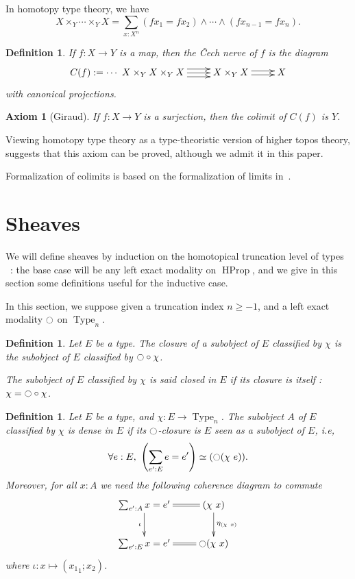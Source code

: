 \documentclass[conference]{IEEEtran}
\makeatletter
\newtheorem{defi}[thm]{Definition}
\newtheorem{ax}[thm]{Axiom}
\newcommand{\ie}{i.e,\xspace}
\def\dar[#1]#2{\ar@<-#2>[#1]\ar@<#2>[#1]} %
\def\tar[#1]#2{\ar@<#2>[#1]\ar@<0pt>[#1]\ar@<-#2>[#1]} %
\DeclareMathOperator{\Type}{Type}
\DeclareMathOperator{\HProp}{HProp}
\newcommand{\modal}{\ensuremath{\ocircle}}
\makeatother
\begin{document}
In homotopy type theory, we have 
$$X\times_Y \cdots\times_Y X = \sum_{x:X^n} (f x_1 = f x_2) \land
\cdots \land (f x_{n-1} = f x_n).$$
\begin{defi}
  If $f:X \to Y$ is a map, then the {\em \v{C}ech nerve} of $f$ is the
  diagram
  $$\xymatrix{
    C(f) := \cdots~ X \times_Y X \times_Y X \tar[r]{4pt} & X \times_Y X \dar[r]{2pt} & X
  }$$
with canonical projections.
\end{defi}

\begin{ax}[Giraud]
  If $f:X\to Y$ is a surjection, then the
colimit of $C(f)$ is $Y$.
\end{ax}

Viewing homotopy type theory as a
type-theoristic version of higher topos theory, \cite{lurie} suggests that this
axiom can be proved, although we admit it in this paper.

Formalization of colimits is based on the formalization of limits in~\cite{lumsdaine}.

\section{Sheaves}
\label{sec:sheaves}

We will define sheaves by induction on the homotopical truncation level of types
~: the base case will be any left exact modality on $\HProp$, and we
give in this section some definitions useful for the inductive case.


In this section, we suppose given a truncation index $n\geqslant -1$,
and a left exact modality $\modal$ on $\Type_n$.

\begin{defi}
  Let $E$ be a type. The {\em closure} of a subobject of $E$ classified by $\chi$
  is the subobject of $E$ classified by $\modal \circ \chi$.

  The subobject of $E$ classified by $\chi$ is said {\em closed in
    $E$} if its closure is itself : $\chi = \modal \circ \chi$.
\end{defi}

\begin{defi}
  Let $E$ be a type, and $\chi:E \to \Type_n$. The subobject $A$ of $E$
  classified by $\chi$ is {\em dense} in $E$ if its $\modal$-closure
  is $E$ seen as a subobject of $E$, \ie
  $$\forall e:E,~ \left(\sum_{e':E} e=e'\right) \simeq (\modal (\chi~e)).$$ 
  Moreover, for all $x:A$ we need the following coherence diagram to
  commute
  $$\xymatrix{
    \sum_{e':A} x = e' \ar@{=}[r] \ar[d]_\iota & (\chi~x) \ar[d]^{\eta_{(\chi~x)}}\\
    \sum_{e':E} x = e' \ar@{=}[r] & \modal (\chi~x)
  }$$
  where $\iota: x \mapsto ({x_1}_1 ; x_2)$.
\end{defi}
\end{document}

